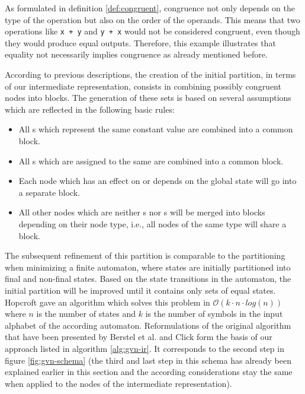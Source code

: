 As formulated in definition \ref{def:congruent}, congruence not only depends on the type of the operation but also on the order of the operands. This means that two operations like \lstinline!x + y! and \lstinline!y + x! would not be considered congruent, even though they would produce equal outputs. Therefore, this example illustrates that equality not necessarily implies congruence as already mentioned before.

According to previous descriptions, the creation of the initial partition, in terms of our intermediate representation, consists in combining possibly congruent nodes into blocks. The generation of these sets is based on several assumptions which are reflected in the following basic rules:

\begin{itemize}
\item All s  which represent the same constant value are combined into a common block.
\item All s which are assigned to the same  are combined into a common block.
\item Each node which has an effect on or depends on the global state will go into a separate block.
\item All other nodes which are neither s nor s will be merged into blocks depending on their node type, i.e., all nodes of the same type will share a block.
\end{itemize}

The subsequent refinement of this partition is comparable to the partitioning when minimizing a finite automaton, where states are initially partitioned into final and non-final states. Based on the state transitions in the automaton, the initial partition will be improved until it contains only sets of equal states. Hopcroft \cite{hopcroft:1971:an-n-log-n-algorithm} gave an algorithm which solves this problem in $\mathcal{O}(k\cdot n\cdot \mathit{log}(n))$ where $n$ is the number of states and $k$ is the number of symbols in the input alphabet of the according automaton.
Reformulations of the original algorithm that have been presented by Berstel et al. \cite{berstel:2010:minimization-of-automata} and Click \cite{click:1995:combininganalyses} form the basis of our approach listed in algorithm \ref{alg:gvn-ir}.
It corresponds to the second step in figure \ref{fig:gvn-schema} (the third and last step in this schema has already been explained earlier in this section and the according considerations stay the same when applied to the nodes of the intermediate representation).


